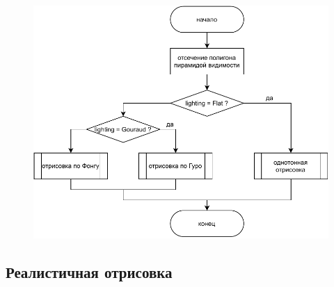 \begin{figure}
    \centering
    \includegraphics[width=\linewidth,height=\textheight,keepaspectratio]{diagrams/draw-face.pdf}
\end{figure}

\subsection{Реалистичная отрисовка}


